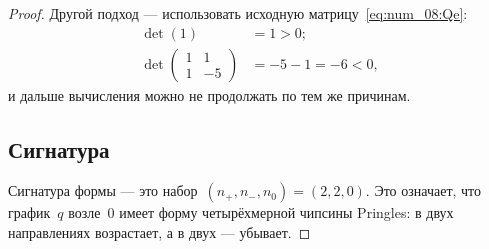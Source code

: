 \begin{proof}
	Другой подход --- использовать исходную матрицу~\eqref{eq:num_08:Qe}:
	\begin{align*}
		\det(1) &= 1 > 0;
		\\
		\det
		\left( 
			\begin{array}{rr}
				1 & 1 \\
				1 & -5
			\end{array}
		\right)
		&=
		-5-1 = -6 < 0,
	\end{align*}
	и дальше вычисления можно не продолжать по тем же причинам.

	\subsection{Сигнатура}
	Сигнатура формы --- это набор~$(n_+, n_-, n_0) = (2, 2, 0)$.
	Это означает, что график~$q$ возле~$0$ имеет форму четырёхмерной чипсины Pringles: в двух направлениях возрастает, а в двух --- убывает.
\end{proof}
